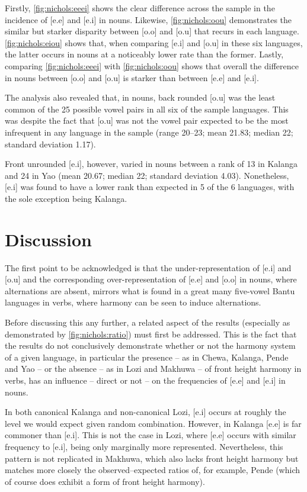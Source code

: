 \documentclass[output=paper]{langscibook}
\begin{document}
Firstly, \autoref{fig:nichols:eeei} shows the clear difference across the sample in the incidence of [e.e] and [e.i] in nouns. Likewise, \autoref{fig:nichols:oou} demonstrates the similar but starker disparity between [o.o] and [o.u] that recurs in each language. \autoref{fig:nichols:eiou} shows that, when comparing [e.i] and [o.u] in these six languages, the latter occurs in nouns at a noticeably lower rate than the former. Lastly, comparing \autoref{fig:nichols:eeei} with \autoref{fig:nichols:oou} shows that overall the difference in nouns between [o.o] and [o.u] is starker than between [e.e] and [e.i].

The analysis also revealed that, in nouns, back rounded [o.u] was the least common of the 25 possible vowel pairs in all six of the sample languages. This was despite the fact that [o.u] was not the vowel pair expected to be the most infrequent in any language in the sample (range 20--23; mean 21.83; median 22; standard deviation 1.17).

Front unrounded [e.i], however, varied in nouns between a rank of 13 in Kalanga and 24 in Yao (mean 20.67; median 22; standard deviation 4.03). Nonetheless, [e.i] was found to have a lower rank than expected in 5 of the 6 languages, with the sole exception being Kalanga.

\section{Discussion}
\begin{sloppypar}
The first point to be acknowledged is that the under-representation of [e.i] and [o.u] and the corresponding over-representation of [e.e] and [o.o] in nouns, where alternations are absent, mirrors what is found in a great many five-vowel Bantu languages in verbs, where harmony can be seen to induce alternations.
\end{sloppypar}

Before discussing this any further, a related aspect of the results (especially as demonstrated by \autoref{fig:nichols:ratio}) must first be addressed. This is the fact that the results do not conclusively demonstrate whether or not the harmony system of a given language, in particular the presence -- as in Chewa, Kalanga, Pende and Yao -- or the absence -- as in Lozi and Makhuwa -- of front height harmony in verbs, has an influence -- direct or not -- on the frequencies of [e.e] and [e.i] in nouns.

In both canonical Kalanga and non-canonical Lozi, [e.i] occurs at roughly the level we would expect given random combination. However, in Kalanga [e.e] is far commoner than [e.i]. This is not the case in Lozi, where [e.e] occurs with similar frequency to [e.i], being only marginally more represented. Nevertheless, this pattern is not replicated in Makhuwa, which also lacks front height harmony but matches more closely the observed--expected ratios of, for example, Pende (which of course does exhibit a form of front height harmony).
\end{document}
